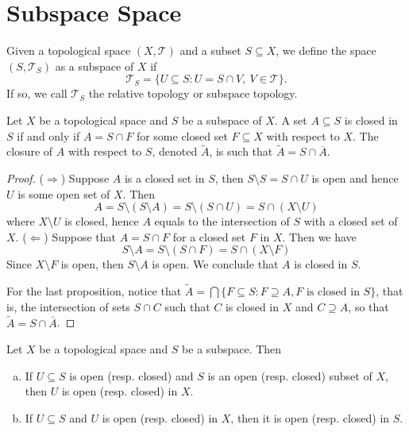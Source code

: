 \section{Subspace Space}

\begin{definition}
\label{def: subspace topology}
Given a topological space \((X, \mathcal T)\) and a subset \(S \subseteq X\),
we define the space \((S, \mathcal T_S)\) as a subspace of \(X\) if
\[
  \mathcal T_S = \{U \subseteq S \colon U = S \cap V,\ V \in \mathcal T\}.
\]
If so, we call \(\mathcal T_S\) the relative topology or subspace topology.
\end{definition}

\begin{proposition}\label{prop: closed in subspace}
Let \(X\) be a topological space and \(S\) be a subspace of \(X\). A set \(A
\subseteq S\) is closed in \(S\) if and only if \(A = S \cap F\) for some
closed set \(F \subseteq X\) with respect to \(X\). The closure of \(A\) with
respect to \(S\), denoted \(\widetilde A\), is such that \(\widetilde A = S
\cap \overline A\).
\end{proposition}

\begin{proof}
(\(\Rightarrow\)) Suppose \(A\) is a closed set in \(S\), then \(S \setminus
S = S \cap U\) is open and hence \(U\) is some open set of \(X\). Then
\[
  A = S \setminus (S \setminus A) = S \setminus (S \cap U)
  = S \cap (X \setminus U)
\]
where \(X \setminus U\) is closed, hence \(A\) equals to the intersection of
\(S\) with a closed set of \(X\).
(\(\Leftarrow\)) Suppose that \(A = S \cap F\) for a closed set \(F\) in
\(X\). Then we have
\[
  S \setminus A = S \setminus (S \cap F) = S \cap (X \setminus F)
\]
Since \(X\setminus F\) is open, then \(S \setminus A\) is open. We conclude
that \(A\) is closed in \(S\).

For the last proposition, notice that \(\widetilde A = \bigcap \{F \subseteq S
\colon F \supseteq A, F \text{ is closed in } S\}\), that is, the intersection of
sets \(S \cap C\) such that \(C\) is closed in \(X\) and \(C \supseteq A\), so
that \(\widetilde A = S \cap \overline A\).
\end{proof}

\begin{proposition}\label{prop: relative open to open}
Let \(X\) be a topological space and \(S\) be a subspace. Then
\begin{enumerate}[(a)]
  \item If \(U \subseteq S\) is open (resp. closed) and \(S\) is an open
    (resp. closed) subset of \(X\), then \(U\) is open (resp. closed) in
    \(X\).
  \item If \(U \subseteq S\) and \(U\) is open (resp. closed) in \(X\), then
    it is open (resp. closed) in \(S\).
\end{enumerate}
\end{proposition}

